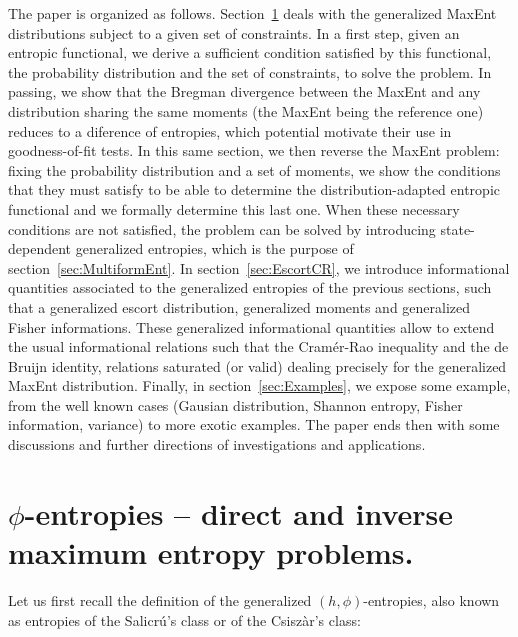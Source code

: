 \documentclass[english,sort&compress]{elsarticle}
\theoremstyle{definition}
\theoremstyle{plain}
\theoremstyle{plain}
\begin{document}
The paper  is organized as  follows. Section~\ref{sec:MaxPhiEnt} deals  with the
generalized MaxEnt  distributions subject to a  given set of  constraints.  In a
first  step, given  an entropic  functional,  we derive  a sufficient  condition
satisfied  by this  functional,  the  probability distribution  and  the set  of
constraints,  to  solve the  problem.   In passing,  we  show  that the  Bregman
divergence between the MaxEnt and any distribution sharing the same moments (the
MaxEnt  being the  reference one)  reduces to  a diference  of  entropies, which
potential motivate their use in  goodness-of-fit tests. In this same section, we
then reverse the  MaxEnt problem: fixing the probability  distribution and a set
of  moments, we  show  the  conditions that  they  must satisfy  to  be able  to
determine the distribution-adapted entropic functional and we formally determine
this last one.   When these necessary conditions are  not satisfied, the problem
can be solved by introducing state-dependent generalized entropies, which is the
purpose  of section~\ref{sec:MultiformEnt}.   In  section~\ref{sec:EscortCR}, we
introduce informational  quantities associated  to the generalized  entropies of
the previous sections, such  that a generalized escort distribution, generalized
moments  and generalized Fisher  informations.  These  generalized informational
quantities  allow to  extend the  usual  informational relations  such that  the
Cram\'er-Rao  inequality and  the de  Bruijn identity,  relations  saturated (or
valid) dealing  precisely for the generalized MaxEnt  distribution.  Finally, in
section~\ref{sec:Examples}, we  expose some example,  from the well  known cases
(Gausian distribution,  Shannon entropy,  Fisher information, variance)  to more
exotic  examples.   The  paper  ends  then with  some  discussions  and  further
directions of investigations and applications.




\section{$\phi$-entropies -- direct and inverse maximum entropy problems.}
\label{sec:MaxPhiEnt}

Let us first recall the definition of the generalized $(h,\phi)$-entropies, also
known   as  entropies   of  the   Salicr\'u's  class   or  of   the  Csisz\`ar's
class:
\end{document}
